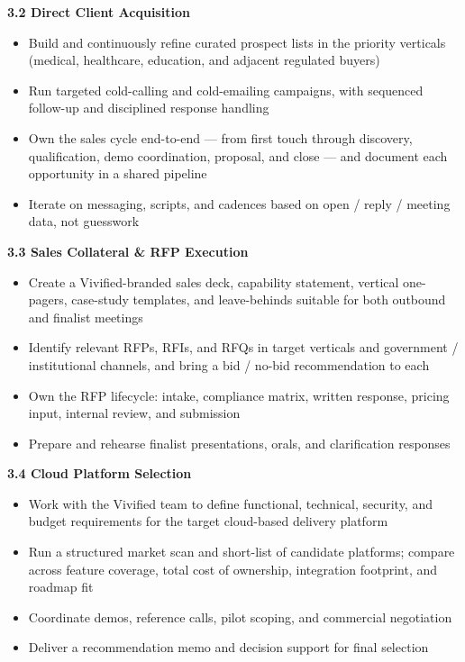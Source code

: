 \documentclass{toospoint}
\begin{document}
\vspace{4pt}
\noindent\textbf{\color{TPDark}3.2 \quad Direct Client Acquisition}
\begin{itemize}[leftmargin=1.5em, itemsep=2pt, topsep=2pt]
  \item Build and continuously refine curated prospect lists in the priority verticals (medical, healthcare, education, and adjacent regulated buyers)
  \item Run targeted cold-calling and cold-emailing campaigns, with sequenced follow-up and disciplined response handling
  \item Own the sales cycle end-to-end --- from first touch through discovery, qualification, demo coordination, proposal, and close --- and document each opportunity in a shared pipeline
  \item Iterate on messaging, scripts, and cadences based on open / reply / meeting data, not guesswork
\end{itemize}

\vspace{4pt}
\noindent\textbf{\color{TPDark}3.3 \quad Sales Collateral \& RFP Execution}
\begin{itemize}[leftmargin=1.5em, itemsep=2pt, topsep=2pt]
  \item Create a Vivified-branded sales deck, capability statement, vertical one-pagers, case-study templates, and leave-behinds suitable for both outbound and finalist meetings
  \item Identify relevant RFPs, RFIs, and RFQs in target verticals and government / institutional channels, and bring a bid / no-bid recommendation to each
  \item Own the RFP lifecycle: intake, compliance matrix, written response, pricing input, internal review, and submission
  \item Prepare and rehearse finalist presentations, orals, and clarification responses
\end{itemize}

\vspace{4pt}
\noindent\textbf{\color{TPDark}3.4 \quad Cloud Platform Selection}
\begin{itemize}[leftmargin=1.5em, itemsep=2pt, topsep=2pt]
  \item Work with the Vivified team to define functional, technical, security, and budget requirements for the target cloud-based delivery platform
  \item Run a structured market scan and short-list of candidate platforms; compare across feature coverage, total cost of ownership, integration footprint, and roadmap fit
  \item Coordinate demos, reference calls, pilot scoping, and commercial negotiation
  \item Deliver a recommendation memo and decision support for final selection
\end{itemize}
\end{document}
